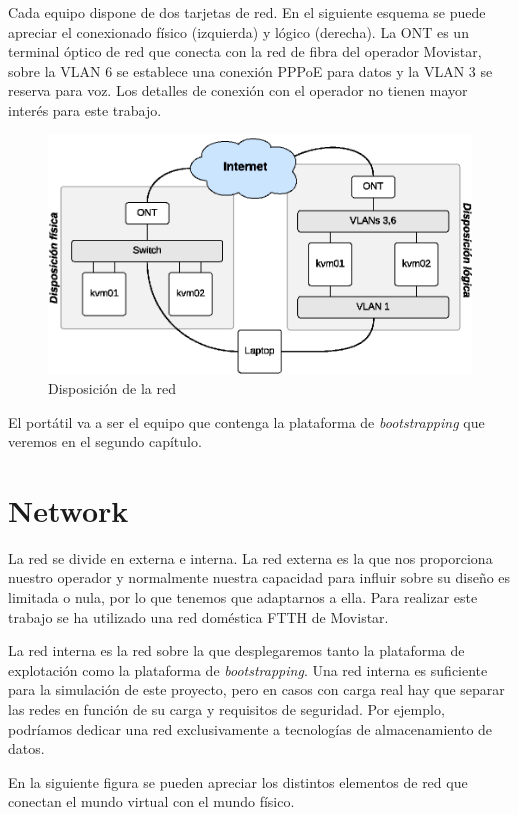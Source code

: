 \documentclass[a4paper,12pt,spanish,final]{epsc_tfc_pfc}
\begin{document}
Cada equipo dispone de dos tarjetas de red. En el siguiente esquema se puede apreciar el conexionado físico (izquierda) y lógico (derecha). La ONT es un terminal óptico de red que conecta con la red de fibra del operador Movistar, sobre la VLAN 6 se establece una conexión PPPoE para datos y la VLAN 3 se reserva para voz. Los detalles de conexión con el operador no tienen mayor interés para este trabajo.

\begin{figure}[h]
  \centering
    \includegraphics[scale=1]{layout}
      \caption{Disposición de la red}
\end{figure}

El portátil va a ser el equipo que contenga la plataforma de \emph{bootstrapping} que veremos en el segundo capítulo.

\section{Network}

La red se divide en externa e interna. La red externa es la que nos proporciona nuestro operador y normalmente nuestra capacidad para influir sobre su diseño es limitada o nula, por lo que tenemos que adaptarnos a ella. Para realizar este trabajo se ha utilizado una red doméstica FTTH de Movistar.

La red interna es la red sobre la que desplegaremos tanto la plataforma de explotación como la plataforma de \emph{bootstrapping}. Una red interna es suficiente para la simulación de este proyecto, pero en casos con carga real hay que separar las redes en función de su carga y requisitos de seguridad. Por ejemplo, podríamos dedicar una red exclusivamente a tecnologías de almacenamiento de datos.

En la siguiente figura se pueden apreciar los distintos elementos de red que conectan el mundo virtual con el mundo físico.
\end{document}
